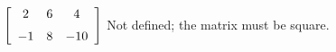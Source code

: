 {$\left[ \begin {array}{ccc} 2&6&4\\\noalign{\medskip}-1&8&-10
\end {array} \right]$} 
{Not defined; the matrix must be square.}



  

